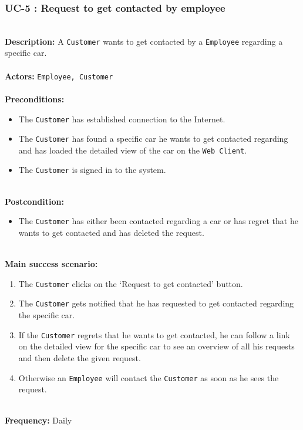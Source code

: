 \subsubsection{UC-5 : Request to get contacted by employee}
\label{request-contact-use-case}
\HRule \\[0.4cm]
\textbf{Description:} A \texttt{Customer} wants to get contacted by a \texttt{Employee} regarding a specific car. \\
\HRule \\[0.4cm]
\textbf{Actors:} \texttt{Employee, Customer}\\
\HRule \\[0.4cm]
\textbf{Preconditions:} 
\begin{itemize}
    \item The \texttt{Customer} has established connection to the Internet.
    \item The \texttt{Customer} has found a specific car he wants to get contacted regarding and has loaded the detailed view of the car on the \texttt{Web Client}.
    \item The \texttt{Customer} is signed in to the system.
\end{itemize}
\HRule \\[0.4cm]
\textbf{Postcondition:}
\begin{itemize}
    \item The \texttt{Customer} has either been contacted regarding a car or has regret that he wants to get contacted and has deleted the request.
\end{itemize}
\HRule \\[0.4cm]
\textbf{Main success scenario:}
\begin{enumerate}
    \item The \texttt{Customer} clicks on the `Request to get contacted' button.
    \item The \texttt{Customer} gets notified that he has requested to get contacted regarding the specific car.
    \item If the \texttt{Customer} regrets that he wants to get contacted, he can follow a link on the detailed view for the specific car to see an overview of all his requests and then delete the given request.
    \item Otherwise an \texttt{Employee} will contact the \texttt{Customer} as soon as he sees the request.
\end{enumerate}

\HRule \\[0.4cm]
\textbf{Frequency:}
Daily \\
\HRule \\[0.4cm]

